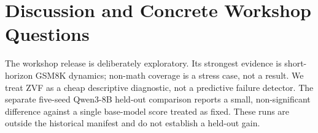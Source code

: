 \section{Discussion and Concrete Workshop Questions}
\label{sec:conclusion}

The workshop release is deliberately exploratory. Its strongest evidence is
short-horizon GSM8K dynamics; non-math coverage is a stress case, not a
result. We treat ZVF as a cheap descriptive diagnostic, not a predictive
failure detector. The separate five-seed Qwen3-8B held-out comparison reports a
small, non-significant difference against a single base-model score treated
as fixed. These runs are outside the historical manifest and do not establish
a held-out gain.

